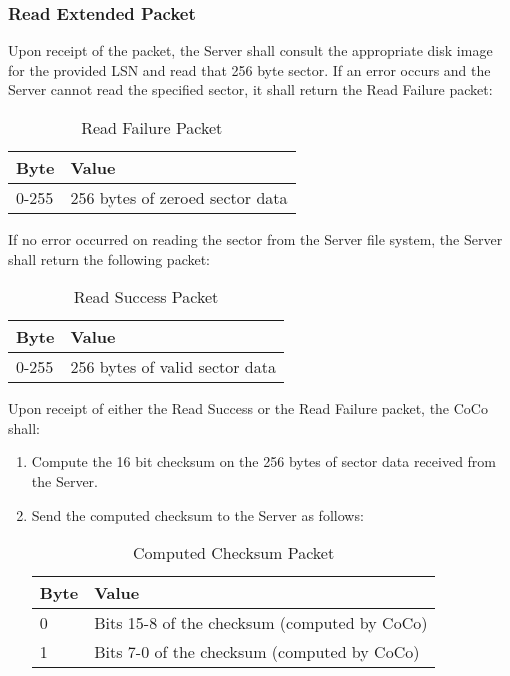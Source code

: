 \documentclass{article}
\begin{document}
\subsubsection{Read Extended Packet}

Upon receipt of the packet, the Server shall consult the appropriate disk image for the provided LSN and read that 256 byte sector. If an error occurs and the Server cannot read the specified sector, it shall return the Read Failure packet:

\begin{table}[ht]
\caption{Read Failure Packet}
\begin{center}
\begin{tabular}{|ll|}
\hline
Byte & Value \\ \hline
0-255 & 256 bytes of zeroed sector data \\
\hline
\end{tabular}
\end{center}
\end{table}

If no error occurred on reading the sector from the Server file system, the Server shall return the following packet:

\begin{table}[ht]
\caption{Read Success Packet}
\begin{center}
\begin{tabular}{|ll|}
\hline
Byte & Value \\ \hline
0-255 & 256 bytes of valid sector data \\
\hline
\end{tabular}
\end{center}
\end{table}

Upon receipt of either the Read Success or the Read Failure packet, the CoCo shall:

\begin{enumerate}
\item Compute the 16 bit checksum on the 256 bytes of sector data received from the Server.
\item Send the computed checksum to the Server as follows:

\begin{table}[ht]
\caption{Computed Checksum Packet}
\begin{center}
\begin{tabular}{|ll|}
\hline
Byte & Value \\ \hline
0 & Bits 15-8 of the checksum (computed by CoCo) \\
1 & Bits 7-0 of the checksum (computed by CoCo) \\
\hline
\end{tabular}
\end{center}
\end{table}

\end{enumerate}
\end{document}

